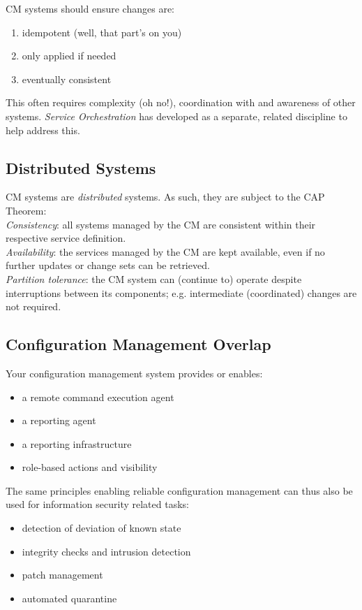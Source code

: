 \documentclass[xga]{xdvislides}
\begin{document}
CM systems should ensure changes are:
\begin{enumerate}
	\item idempotent (well, that part's on you)
	\item only applied if needed
	\item eventually consistent
\end{enumerate}
\vspace{.5in}

This often requires complexity (oh no!), coordination
with and awareness of other systems.  {\em Service
Orchestration} has developed as a separate, related
discipline to help address this.

\subsection{Distributed Systems}
CM systems are {\em distributed} systems.  As such,
they are subject to the CAP Theorem: \\

{\em Consistency}: all systems managed by the CM are
consistent within their respective service definition.
\\

{\em Availability}: the services managed by the CM are
kept available, even if no further updates or change
sets can be retrieved. \\

{\em Partition tolerance}: the CM system can (continue
to) operate despite interruptions between its
components; e.g. intermediate (coordinated) changes
are not required.

\subsection{Configuration Management Overlap}

Your configuration management system provides or
enables:

\begin{itemize}
	\item a remote command execution agent
	\item a reporting agent
	\item a reporting infrastructure
	\item role-based actions and visibility
\end{itemize}
\vspace{.5in}

The same principles enabling reliable configuration
management can thus also be used for information
security related tasks:
\begin{itemize}
	\item detection of deviation of known state
	\item integrity checks and intrusion detection
	\item patch management
	\item automated quarantine
\end{itemize}
\end{document}
